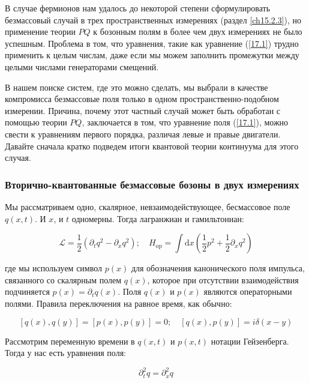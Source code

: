 \documentclass[main.tex]{subfiles}
\begin{document}
В случае фермионов нам удалось до некоторой степени сформулировать безмассовый случай в трех пространственных измерениях (раздел \ref{ch15.2.3}), но применение теории $PQ$ к бозонным полям в более чем двух измерениях не было успешным. Проблема в том, что уравнения, такие как уравнение (\ref{17.1}) трудно применить к целым числам, даже если мы можем заполнить промежутки между целыми числами генераторами смещений.

В нашем поиске систем, где это можно сделать, мы выбрали в качестве компромисса безмассовые поля только в одном пространственно-подобном измерении. Причина, почему этот частный случай может быть обработан с помощью теории $PQ$, заключается в том, что уравнение поля (\ref{17.1}), можно свести к уравнениям первого порядка, различая левые и правые двигатели. Давайте сначала кратко подведем итоги квантовой теории континуума для этого случая.





\subsubsection{Вторично-квантованные безмассовые бозоны в двух измерениях}\label{ch17.1.1}

Мы рассматриваем одно, скалярное, невзаимодействующее, бесмассовое поле $q(x, t)$. И $x$, и $t$ одномерны. Тогда лагранжиан и гамильтониан:

\begin{equation}\label{17.2}
\mathcal{L}=\frac{1}{2}\left(\partial_{t} q^{2}-\partial_{x} q^{2}\right) ; \quad H_{\mathrm{op}}=\int \mathrm{d} x\left(\frac{1}{2} p^{2}+\frac{1}{2} \partial_{x} q^{2}\right)
\end{equation}

где мы используем символ $p(x)$ для обозначения канонического поля импульса, связанного со скалярным полем $q(x)$, которое при отсутствии взаимодействия подчиняется $p(x)=\partial_{t} q(x)$. Поля $q(x)$ и $p(x)$ являются операторными полями. Правила переключения на равное время, как обычно:

\begin{equation}\label{17.3}
[q(x), q(y)]=[p(x), p(y)]=0 ; \quad[q(x), p(y)]=i \delta(x-y)
\end{equation}

Рассмотрим переменную времени в $q(x, t)$ и $p(x, t)$ нотации Гейзенберга. Тогда у нас есть уравнения поля:

\begin{equation}\label{17.4}
\partial_{t}^{2} q=\partial_{x}^{2} q
\end{equation}
\end{document}
